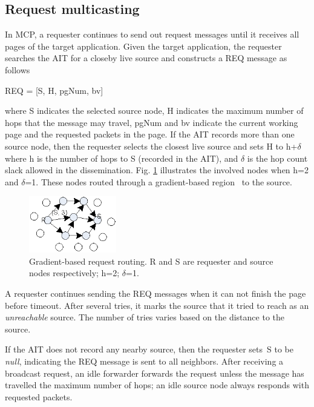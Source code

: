 \subsection{Request multicasting}
In MCP, a requester continues to send out request messages until it receives all pages of the target application. Given 
the target application, the requester searches the AIT for a closeby live source and constructs a REQ message as follows
\begin{center}
REQ = [S, H, pgNum, bv] \\
\end{center}
where S indicates the selected source node, H indicates the maximum number of hops that the message may travel, pgNum 
and bv indicate the current working page and the requested packets in the page. If the AIT records more than one source 
node, then the requester selects the closest live source and sets H to h+$\delta$ where h is the number of hops to S 
(recorded in the AIT), and $\delta$ is the hop count slack allowed in the dissemination. 
Fig. \ref{fgrad} illustrates the involved nodes when h=2 and $\delta$=1. These nodes routed through a gradient-based 
region~\cite{groute} to the source. 

\begin{figure}[htbp]
\begin{center}
\includegraphics[width=1.5in]{figures/fgrad.eps}
\caption[Gradient-based request routing.]{Gradient-based request routing. R and S are requester and source nodes 
respectively; h=2; $\delta$=1.}
\label{fgrad}
\end{center}
\end{figure}

A requester continues sending the REQ messages when it can not finish the page before timeout. After several tries, it 
marks the source that it tried
to reach as an {\em unreachable} source. The number of tries varies based on the distance to the source. 

If the AIT does not record any nearby source, then the requester sets~S to be {\em null}, indicating the REQ message is 
sent to all neighbors. After receiving a broadcast request, an idle forwarder forwards the request unless the message 
has travelled the maximum number of hops; an idle source node always responds with requested packets.

